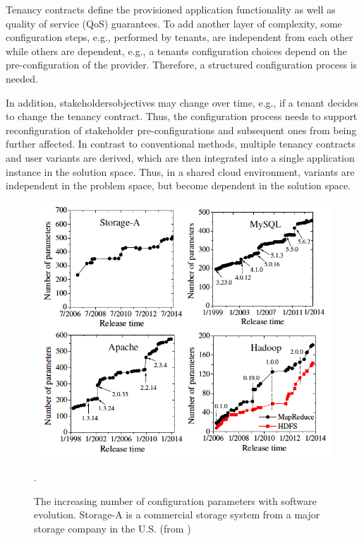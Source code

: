 \documentclass{newsig}
\begin{document}
Tenancy contracts define
the provisioned application functionality as well as quality
of service (QoS) guarantees. To add another layer of complexity, some configuration steps, e.g., performed
by tenants, are independent from each other while others
are dependent, e.g., a tenant\textquotesingle s configuration choices depend
on the pre-configuration of the provider. Therefore, a structured configuration process is needed. 

In addition,
stakeholders\textquotesingle   objectives may change over time, e.g., if a tenant
decides to change the tenancy contract. Thus, the configuration process needs to 
support reconfiguration of stakeholder
pre-configurations and subsequent ones from being further
affected. In contrast to conventional methods, multiple
tenancy contracts and user variants are derived, which are then 
integrated into a single application instance in the solution
space. Thus, in a shared cloud environment, variants are independent
in the problem space, but become dependent in
the solution space.


 \begin{figure}[tbh]
\centering
\includegraphics[width=0.9\columnwidth]{Figures/knobs_paper_fig1}
\caption{The increasing number of configuration parameters with
software evolution. Storage-A is a commercial storage system from a
major storage company in the U.S. (from \cite{xu2015hey})}.
\label{fig:knobs_figure}
\end{figure}
\end{document}

